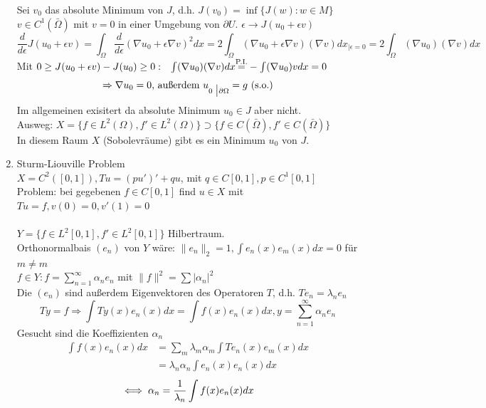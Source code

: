 \begin{enumerate}
	Sei $v_{0}$ das absolute Minimum von $J$, d.h. $J(v_{0}) = \inf \{ J(w): w \in M \}$ \\
	$v \in C^{1}(\bar \Omega)$ mit $v = 0$ in einer Umgebung von $\partial U$. $\epsilon \rightarrow J(u_{0} + \epsilon v)$
	\[ \frac{d}{d\epsilon} J(u_{0} + \epsilon v) = \int_{\Omega} \frac{d}{d\epsilon} (\nabla u_{0} + \epsilon \nabla v)^{2} dx = 2 \int_{\Omega} (\nabla u_{0} + \epsilon \nabla v)(\nabla v) dx_{\big| \epsilon = 0} = 2 \int_\Omega (\nabla u_{0}) (\nabla v) dx \]
	Mit $0 \geq J(u_{0} + \epsilon v)- J(u_{0}) \geq 0: \hspace{0.25cm} \int (\nabla u_{0})(\nabla v) dx \overset{\text{P.I.}}{{=}} - \int (\nabla u_{0})v dx = 0$ \\
	\[ \Rightarrow \nabla u_{0} = 0 \text{, au{\ss}erdem } u_{0 \hspace{0.1cm} \big| \partial \Omega} = g \text{ (s.o.)} \]
	Im allgemeinen exisitert da absolute Minimum $u_{0} \in J$ aber nicht. \\
	Ausweg: $X = \{ f \in L^{2}(\Omega), f' \in L^{2}(\Omega) \} \supset \{f \in C(\bar \Omega), f' \in C(\bar \Omega) \} $	\\
	In diesem Raum $X$ (Sobolevräume) gibt es ein Minimum $u_{0}$ von $J$. \\
	\item Sturm-Liouville Problem  \\
	$X = C^{2}([0, 1]), Tu = (pu')' + qu$, mit $q \in C[0, 1], p \in C^{1}[0, 1]$ \\ 
	Problem: bei gegebenen $f \in C[0, 1]$ find $u \in X$ mit $Tu = f, v(0) = 0, v'(1) = 0$ \\ \\
	$Y = \{ f \in L^{2}[0, 1], f' \in L^{2}[0, 1] \}$ Hilbertraum. \\
	Orthonormalbais $(e_{n})$ von $Y$ wäre: $\| e_{n} \|_{2} = 1, \int e_{n}(x) e_{m}(x) dx = 0$ für $m \neq m$ \\
	$f \in Y: f = \sum_{n = 1}^{\infty} \alpha_{n} e_{n}$ mit $\| f \|^2 = \sum | \alpha_{n} |^2$ \\
	Die $(e_{n})$ sind au{\ss}erdem Eigenvektoren des Operatoren $T$, d.h. $Te_{n} = \lambda_{n} e_{n}$ \\
	\[ Ty = f \Rightarrow \int Ty(x) e_{n}(x) dx = \int f(x) e_{n}(x) dx, y = \sum_{n = 1}^{\infty} \alpha_{n} e_{n} \]
	Gesucht sind die Koeffizienten $\alpha_{n}$
	\begin{align*}
		\int f(x) e_{n}(x) dx & = \sum_{m} \lambda_{m} \alpha_{m} \int T e_{n}(x) e_{m}(x) dx \\
							  & =  \lambda_{n} \alpha_{n} \int e_{n}(x) e_{n}(x) dx
	\end{align*}
	\[ \iff \alpha_{n} = \frac{1}{\lambda_n} \int f(x) e_{n}(x) dx \]
\end{enumerate}


